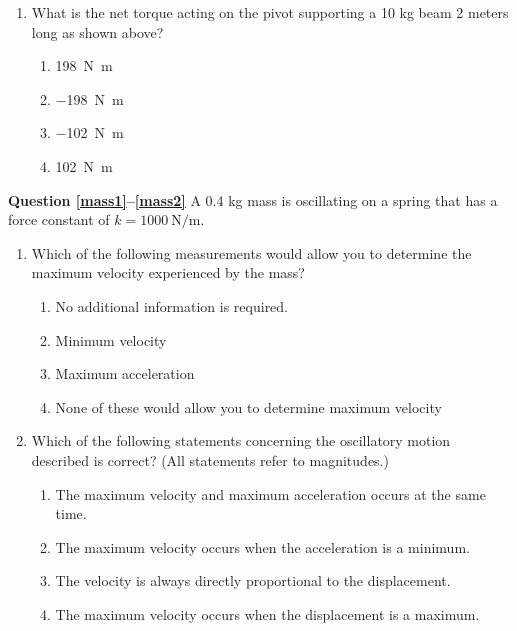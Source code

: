 \documentclass[11pt]{article}
\begin{document}
\begin{multicols}{2}
\begin{enumerate}[leftmargin=18pt,resume]
    \begin{center}
    \end{center}
    
  \item What is the net torque acting on the pivot supporting a 10 kg beam 2
    meters long as shown above?
    \begin{enumerate}[nosep,leftmargin=18pt,label=(\Alph*)]
    \item\SI{198}{\newton.\metre}
    \item\SI{-198}{\newton.\metre}
    \item\SI{-102}{\newton.\metre}
    \item\SI{102}{\newton.\metre}
    \end{enumerate}
  \end{enumerate}
  
  \textbf{Question \ref{mass1}--\ref{mass2}} A 0.4 kg mass is oscillating on a
  spring that has a force constant of $k=\SI{1000}{\newton\per\metre}$.
  \begin{enumerate}[leftmargin=18pt,resume]
  \item Which of the following measurements would allow you to determine the
    maximum velocity experienced by the mass?
    \label{mass1}
    \begin{enumerate}[nosep,leftmargin=18pt,label=(\Alph*)]
    \item No additional information is required.
    \item Minimum velocity
    \item Maximum acceleration
    \item None of these would allow you to determine maximum velocity
    \end{enumerate}
    \vspace{.7in}
    
  \item Which of the following statements concerning the oscillatory motion
    described is correct? (All statements refer to magnitudes.)
    \label{mass2}
    \begin{enumerate}[nosep,leftmargin=18pt,label=(\Alph*)]
    \item The maximum velocity and maximum acceleration occurs at the same time.
    \item The maximum velocity occurs when the acceleration is a minimum.
    \item The velocity is always directly proportional to the displacement.
    \item The maximum velocity occurs when the displacement is a maximum.
    \end{enumerate}
    \vspace{.7in}
  \end{enumerate}
\end{multicols}
\end{document}
